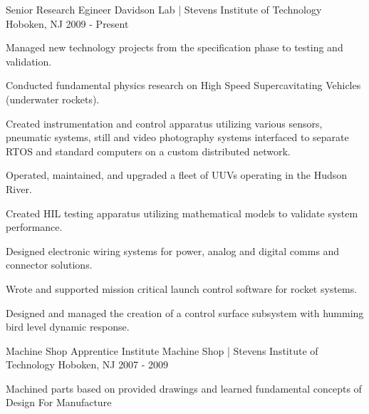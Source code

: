 \begin{cventries}
  \cventry
    {Senior Research Egineer} %
    {Davidson Lab | Stevens Institute of Technology} %
    {Hoboken, NJ} %
    {2009 - Present} %
    {
      \begin{cvitems} %
        \item {Managed new technology projects from the specification phase to
                testing and validation.} 
        \item {Conducted fundamental physics
                research on High Speed Supercavitating Vehicles (underwater
                rockets).}
        \item {Created instrumentation and control apparatus utilizing various
            sensors, pneumatic systems, still and video photography systems
            interfaced to separate RTOS and standard computers on a custom
            distributed network.} 
        \item {Operated, maintained, and upgraded a fleet of UUVs operating in
            the Hudson River.}
        \item {Created HIL testing apparatus utilizing mathematical models to
            validate system performance.} 
        \item {Designed electronic wiring systems for power, analog and digital
            comms and connector solutions.}
        \item {Wrote and supported mission critical launch control software for
            rocket systems.} 
        \item {Designed and managed the creation of a
            control surface subsystem with humming bird level dynamic response.}
      \end{cvitems}
    }


  \cventry
    {Machine Shop Apprentice} %
    {Institute Machine Shop | Stevens Institute of Technology} %
    {Hoboken, NJ} %
    {2007 - 2009} %
    {%
      \begin{cvitems} %
        \item {Machined parts based on provided drawings and learned fundamental
            concepts of Design For Manufacture}
      \end{cvitems}
    }

\end{cventries}
